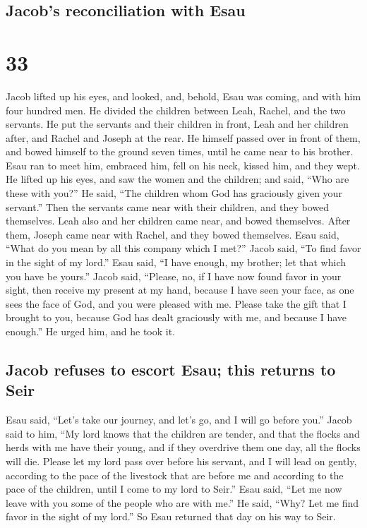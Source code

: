 \hypertarget{jacobs-reconciliation-with-esau}{%
\subsection{Jacob's reconciliation with
Esau}\label{jacobs-reconciliation-with-esau}}

\hypertarget{section-32}{%
\section{33}\label{section-32}}

 Jacob lifted up his eyes, and looked, and, behold, Esau
was coming, and with him four hundred men. He divided the children
between Leah, Rachel, and the two servants.  He put the
servants and their children in front, Leah and her children after, and
Rachel and Joseph at the rear.  He himself passed over in
front of them, and bowed himself to the ground seven times, until he
came near to his brother.  Esau ran to meet him, embraced
him, fell on his neck, kissed him, and they wept.  He
lifted up his eyes, and saw the women and the children; and said, ``Who
are these with you?'' He said, ``The children whom God has graciously
given your servant.''  Then the servants came near with
their children, and they bowed themselves.  Leah also and
her children came near, and bowed themselves. After them, Joseph came
near with Rachel, and they bowed themselves.  Esau said,
``What do you mean by all this company which I met?'' Jacob said, ``To
find favor in the sight of my lord.''  Esau said, ``I have
enough, my brother; let that which you have be yours.'' 
Jacob said, ``Please, no, if I have now found favor in your sight, then
receive my present at my hand, because I have seen your face, as one
sees the face of God, and you were pleased with me. 
Please take the gift that I brought to you, because God has dealt
graciously with me, and because I have enough.'' He urged him, and he
took it.

\hypertarget{jacob-refuses-to-escort-esau-this-returns-to-seir}{%
\subsection{Jacob refuses to escort Esau; this returns to
Seir}\label{jacob-refuses-to-escort-esau-this-returns-to-seir}}

 Esau said, ``Let's take our journey, and let's go, and I
will go before you.''  Jacob said to him, ``My lord knows
that the children are tender, and that the flocks and herds with me have
their young, and if they overdrive them one day, all the flocks will
die.  Please let my lord pass over before his servant,
and I will lead on gently, according to the pace of the livestock that
are before me and according to the pace of the children, until I come to
my lord to Seir.''  Esau said, ``Let me now leave with
you some of the people who are with me.'' He said, ``Why? Let me find
favor in the sight of my lord.''  So Esau returned that
day on his way to Seir.

